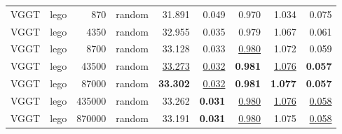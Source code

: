 \begin{table}[H]
\begin{tabular}{llrlrrrrr}
VGGT & lego & 870 & random & 31.891 & 0.049 & 0.970 & 1.034 & 0.075 \\
VGGT & lego & 4350 & random & 32.955 & 0.035 & 0.979 & 1.067 & 0.061 \\
VGGT & lego & 8700 & random & 33.128 & 0.033 & \underline{0.980} & 1.072 & 0.059 \\
VGGT & lego & 43500 & random & \underline{33.273} & \underline{0.032} & \textbf{0.981} & \underline{1.076} & \textbf{0.057} \\
VGGT & lego & 87000 & random & \textbf{33.302} & \underline{0.032} & \textbf{0.981} & \textbf{1.077} & \textbf{0.057} \\
VGGT & lego & 435000 & random & 33.262 & \textbf{0.031} & \underline{0.980} & \underline{1.076} & \underline{0.058} \\
VGGT & lego & 870000 & random & 33.191 & \textbf{0.031} & \underline{0.980} & 1.075 & \underline{0.058} \\
\bottomrule
\end{tabular}
\end{table}